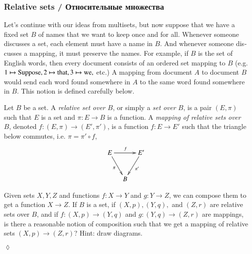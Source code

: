 \documentclass{book}
\def\tn{\textnormal}
\def\to{\rightarrow}
\def\taking{\colon}
\theoremstyle{theoremENG}
\theoremstyle{lemmaENG}
\theoremstyle{propositionENG}
\theoremstyle{corollaryENG}
\theoremstyle{factENG}
\theoremstyle{remarkENG}
\theoremstyle{exampleENG}
\theoremstyle{warningENG}
\theoremstyle{questionENG}
\theoremstyle{guessENG}
\theoremstyle{answerENG}
\theoremstyle{constructionENG}
\theoremstyle{rulesENG}
\theoremstyle{excENG}
\newtheorem{excENG}[subsubsection]{\begin{english}Exercise\end{english}}
\theoremstyle{appENG}
\theoremstyle{definitionENG}
\newtheorem{definitionENG}[subsubsection]{\begin{english}Definition\end{english}}
\theoremstyle{notationENG}
\theoremstyle{conjectureENG}
\theoremstyle{postulateENG}
\newenvironment{exerciseENG}{\begin{excENG}}{\hspace*{\fill}$\lozenge$\end{excENG}}
\theoremstyle{theoremRUS}
\theoremstyle{lemmaRUS}
\theoremstyle{propositionRUS}
\theoremstyle{corollaryRUS}
\theoremstyle{factRUS}
\theoremstyle{remarkRUS}
\theoremstyle{exampleRUS}
\theoremstyle{warningRUS}
\theoremstyle{questionRUS}
\theoremstyle{guessRUS}
\theoremstyle{answerRUS}
\theoremstyle{constructionRUS}
\theoremstyle{rulesRUS}
\theoremstyle{excRUS}
\theoremstyle{appRUS}
\theoremstyle{definitionRUS}
\theoremstyle{notationRUS}
\theoremstyle{conjectureRUS}
\theoremstyle{postulateRUS}
\begin{document}
\begin{english}
\subsubsection{Relative sets / Относительные множества}\label{sec:relative sets}

Let's continue with our ideas from multisets, but now suppose that we have a fixed set $B$ of names that we want to keep once and for all. Whenever someone discusses a set, each element must have a name in $B$. And whenever someone discusses a mapping, it must preserve the names. For example, if $B$ is the set of English words, then every document consists of an ordered set mapping to $B$ (e.g. $1\mapsto \tn{Suppose}, 2\mapsto\tn{that}, 3\mapsto\tn{we},$ etc.) A mapping from document $A$ to document $B$ would send each word found somewhere in $A$ to the same word found somewhere in $B$. This notion is defined carefully below.

\begin{russian} \end{russian}

\begin{definitionENG}\label{def:relative sets}

Let $B$ be a set. A {\em relative set over $B$}, or simply a {\em set over $B$}, is a pair $(E,\pi)$ such that $E$ is a set and $\pi\taking E\to B$ is a function. A {\em mapping of relative sets over $B$}, denoted $f\taking (E,\pi)\to(E',\pi')$, is a function $f\taking E\to E'$ such that the triangle below commutes, i.e. $\pi=\pi'\circ f$,
$$
\xymatrix@=10pt{E\ar[rr]^f\ar[rdd]_{\pi}&&E'\ar[ldd]^{\pi'}\\\\&B
}
$$

\begin{russian} \end{russian}

\end{definitionENG}

\begin{exerciseENG}

Given sets $X,Y,Z$ and functions $f\taking X\to Y$ and $g\taking Y\to Z$, we can compose them to get a function $X\to Z$. If $B$ is a set, if $(X,p), (Y,q),$ and $(Z,r)$ are relative sets over $B$, and if $f\taking (X,p)\to (Y,q)$ and $g\taking (Y,q)\to (Z,r)$ are mappings, is there a reasonable notion of composition such that we get a mapping of relative sets $(X,p)\to (Z,r)$? Hint: draw diagrams.


\end{exerciseENG}
\end{english}
\end{document}
